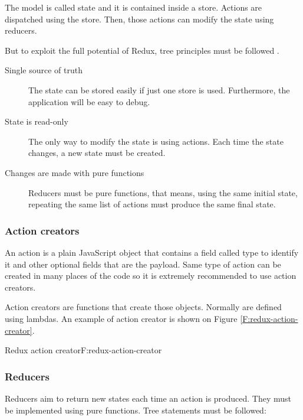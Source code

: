 The model is called state and it is contained inside a store. Actions are
dispatched using the store. Then, those actions can modify the state using
reducers.

But to exploit the full potential of Redux, tree principles must be followed
\cite{redux-principles}.

\begin{description}
	\item [Single source of truth]
	The state can be stored easily if just one store is used. Furthermore, the
	application will be easy to debug.
	
	\item [State is read-only]
	The only way to modify the state is using actions. Each time the state
	changes, a new state must be created.

	\item [Changes are made with pure functions]
	Reducers must be pure functions, that means, using the same initial state,
	repeating the same list of actions must produce the same final state.

\end{description}

\subsubsection{Action creators}

An action is a plain JavaScript object that contains a field called type to 
identify it and other optional fields that are the payload. Same type of action
can be created in many places of the code so it is extremely recommended to use
action creators.

Action creators are functions that create those objects. Normally are defined
using lambdas. An example of action creator is shown on Figure
\ref{F:redux-action-creator}.

\begin{codefigure}{Redux action creator}{F:redux-action-creator}
\end{codefigure}

\subsubsection{Reducers}

Reducers aim to return new states each time an action is produced. They must be
implemented using pure functions. Tree statements must be followed:

